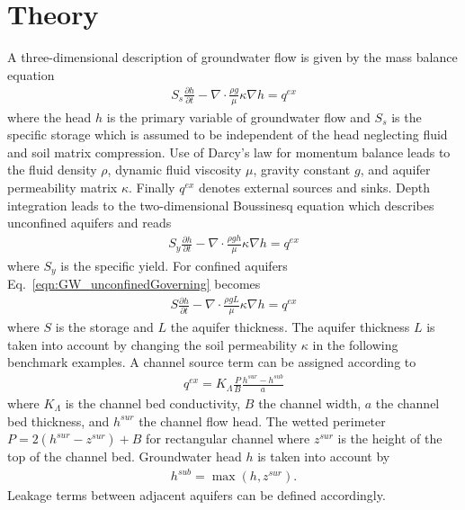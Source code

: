 \section{Theory}
\label{sec:Groundwater_theory}
%
A three-dimensional description of groundwater flow is given by the mass balance equation
%
\begin{eqnarray}
S_s\frac{\partial h}{\partial t}
- \nabla\cdot \frac{\rho g}{\mu} {\kappa} \nabla h
= q^{ex}
\label{eqn:GW_Governing}
\end{eqnarray}
%
where the head $h$ is the primary variable of groundwater flow and $S_s$ is the specific storage which is assumed to be independent of the head neglecting fluid and soil matrix compression. Use of Darcy's law for momentum balance leads to the fluid density $\rho$, dynamic fluid viscosity $\mu$, gravity constant $g$, and aquifer permeability matrix ${\kappa}$. Finally $q^{ex}$ denotes external sources and sinks.
Depth integration leads to the two-dimensional Boussinesq equation which describes unconfined aquifers and reads
%
\begin{eqnarray}
S_y\frac{\partial h}{\partial t}
- \nabla\cdot \frac{\rho g h}{\mu}  {\kappa}  \nabla h
= q^{ex}
\label{eqn:GW_unconfinedGoverning}
\end{eqnarray}
%
where $S_y$ is the specific yield.
For confined aquifers Eq.~\ref{eqn:GW_unconfinedGoverning} becomes
%
\begin{eqnarray}
S\frac{\partial h}{\partial t}
- \nabla\cdot \frac{\rho g L}{\mu}  {\kappa}  \nabla h
 = q^{ex}
\label{eqn:GW_confinedGoverning}
\end{eqnarray}
%
where $S$ is the storage and $L$ the aquifer thickness.
The aquifer thickness $L$ is taken into account by changing the soil permeability ${\kappa }$ in the following benchmark examples.
A channel source term can be assigned according to
%
\begin{eqnarray}
q^{ex} = K_{\Lambda} \frac{P}{B}\frac{h^{sur} - h^{sub}}{a}
\label{eqn:GW_riverSource}
\end{eqnarray}
%
where $K_{\Lambda}$ is the channel bed conductivity, $B$ the channel width, $a$ the channel bed thickness, and $h^{sur}$ the channel flow head. The wetted perimeter $P= 2 (h^{sur}-z^{sur}) + B$ for rectangular channel where $z^{sur}$ is the height of the top of the channel bed. Groundwater head $h$ is taken into account by
%
\begin{eqnarray}
h^{sub} = \max\left( h, z^{sur}\right).
\end{eqnarray}
%
Leakage terms between adjacent aquifers can be defined accordingly.
%
